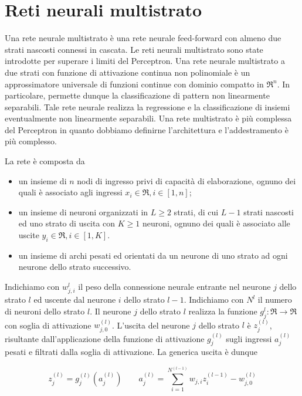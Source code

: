 \chapter{Reti neurali multistrato}
\label{chp:neural-networks-multilayered}
Una rete neurale multistrato è una rete neurale feed-forward con almeno due strati nascosti connessi in cascata. Le reti neurali multistrato sono state introdotte per superare i limiti del Perceptron. Una rete neurale multistrato a due strati con funzione di attivazione continua non polinomiale è un approssimatore universale di funzioni continue con dominio compatto in $\Re^{n}$. In particolare, permette dunque la classificazione di pattern non linearmente separabili. Tale rete neurale realizza la regressione e la classificazione di insiemi eventualmente non linearmente separabili.
Una rete multistrato è più complessa del Perceptron in quanto dobbiamo definirne l'architettura e l'addestramento è più complesso.

La rete è composta da
\begin{itemize}
  \item un insieme di $n$ nodi di ingresso privi di capacità di elaborazione, ognuno dei quali è associato agli ingressi $x_{i}\in\Re,i\in[1,n]$;
  \item un insieme di neuroni organizzati in $L\geq2$ strati, di cui $L-1$ strati nascosti ed uno strato di uscita con $K\geq1$ neuroni, ognuno dei quali è associato alle uscite $y_{i}\in\Re,i\in[1,K]$.
  \item un insieme di archi pesati ed orientati da un neurone di uno strato ad ogni neurone dello strato successivo.
\end{itemize}

Indichiamo con $w_{j,i}^{l}$ il peso della connessione neurale entrante nel neurone $j$ dello strato $l$ ed uscente dal neurone $i$ dello strato $l-1$. Indichiamo con $N^{l}$ il numero di neuroni dello strato $l$.
Il neurone $j$ dello strato $l$ realizza la funzione $g_{j}^{l}:\Re\rightarrow\Re$ con soglia di attivazione $w_{j,0}^{(l)}$.
L'uscita del neurone $j$ dello strato $l$ è $z_{j}^{(l)}$, risultante dall'applicazione della funzione di attivazione $g_{j}^{(l)}$ sugli ingressi $a_{j}^{(l)}$ pesati e filtrati dalla soglia di attivazione. La generica uscita è dunque

\begin{equation}
\label{eqn:neural-network.multilayered.exit}
z_{j}^{(l)}=g_{j}^{(l)}(a_{j}^{(l)}) \qquad a_{j}^{(l)}=\sum_{i=1}^{N^{(l-1)}}w_{j,i}z_{i}^{(l-1)}-w_{j,0}^{(l)}
\end{equation}

